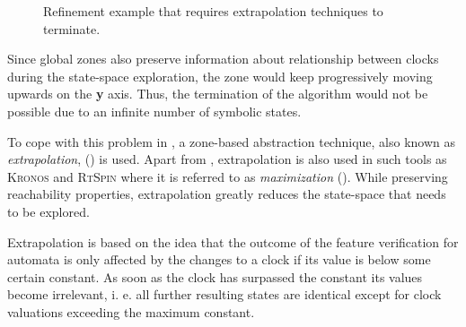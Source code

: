 \begin{figure}
\centering
{}
\caption{Refinement example that requires extrapolation techniques to terminate.} \label{fig:gz-extrapolation}
\end{figure}

Since global zones also preserve information about relationship between clocks during the state-space exploration, the zone would keep progressively moving upwards on the \textbf{y} axis. Thus, the termination of the algorithm would not be possible due to an infinite number of symbolic states. 

To cope with this problem in \jecdar, a zone-based abstraction technique, also known as \textit{extrapolation}, (\textcite{ExtrapolationLU}) is used. Apart from \uppaal, extrapolation is also used in such tools as \textsc{Kronos} and \textsc{RtSpin} where it is referred to as \textit{maximization} (\textcite{maximization}). While preserving reachability properties, extrapolation greatly reduces the state-space that needs to be explored.

Extrapolation is based on the idea that the outcome of the feature verification for automata is only affected by the changes to a clock if its value is below some certain constant. As soon as the clock has surpassed the constant its values become irrelevant, i. e. all further resulting states are identical except for clock valuations exceeding the maximum constant. 

